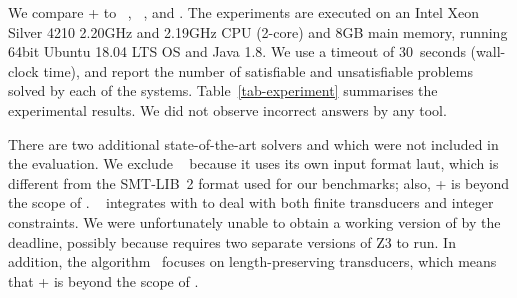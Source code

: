 We compare {\ostrich}+ to {\cvc}~\cite{cvc4}, {\zthree}~\cite{Z3-str}, and {\zthreetrau} \cite{Z3-trau}. 
The experiments are executed on an Intel Xeon Silver 4210 2.20GHz and 2.19GHz CPU (2-core) and 8GB main memory, running 64bit Ubuntu 18.04 LTS OS and Java 1.8. We use a timeout of 30~seconds (wall-clock time), and report the number of satisfiable and unsatisfiable problems solved by each of the systems.
Table~\ref{tab-experiment} summarises the experimental results. We did not observe incorrect answers by any tool.

There are two additional state-of-the-art solvers  {\slent} and {\trauplus} which were not included in
the evaluation. We exclude
{\slent}~\cite{DBLP:conf/kbse/WangCYJ18} because it uses its own input
format laut, which is different from the SMT-LIB~2 format used for our
benchmarks; also, {\transducerbench+} is beyond the scope of {\slent}.
%
{\trauplus}~\cite{AbdullaA+19}  integrates {\trau} with {\sloth} to deal with both finite transducers and integer constraints. We were unfortunately unable
to obtain a working version of {\trauplus} by the deadline, possibly because {\trau} requires two separate versions of Z3 to run. In addition, the algorithm~\cite{AbdullaA+19} focuses on length-preserving transducers, which means that {\transducerbench}+ is beyond the scope of \trauplus.



